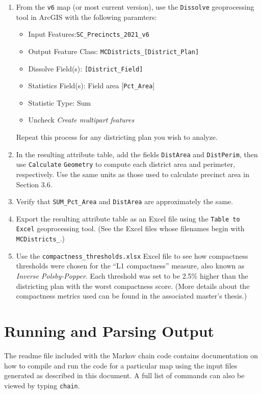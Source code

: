 \documentclass[11pt]{article}
\begin{document}
\begin{enumerate}
\item From the \verb|v6| map (or most current version), use the \verb|Dissolve| geoprocessing tool in ArcGIS with the following paramters:
\begin{itemize}
	\item Input Features:\verb|SC_Precincts_2021_v6|
	\item Output Feature Class: \verb|MCDistricts_[District_Plan]|
	\item Dissolve Field(s): \verb|[District_Field]|
	\item Statistics Field(s): Field area [\verb|Pct_Area|]
	\item Statistic Type: Sum
	\item Uncheck \textit{Create multipart features}
\end{itemize}

Repeat this process for any districting plan you wish to analyze.

\item In the resulting attribute table, add the fields \verb|DistArea| and \verb|DistPerim|, then use \verb|Calculate| \verb|Geometry| to compute each district area and perimeter, respectively. Use the same units as those used to calculate precinct area in Section 3.6.
\item Verify that \verb|SUM_Pct_Area| and \verb|DistArea| are approximately the same.
\item Export the resulting attribute table as an Excel file using the \verb|Table to Excel| geoprocessing tool. (See the Excel files whose filenames begin with \verb|MCDistricts_|.)
\item Use the \verb|compactness_thresholds.xlsx| Excel file to see how compactness thresholds were chosen for the ``L1 compactness'' measure, also known as \textit{Inverse Polsby-Popper}. Each threshold was set to be 2.5\% higher than the districting plan with the worst compactness score. (More details about the compactness metrics used can be found in the associated master's thesis.)
\end{enumerate}

\section{Running and Parsing Output}

The readme file included with the Markov chain code contains documentation on how to compile and run the code for a particular map using the input files generated as described in this document. A full list of commands can also be viewed by typing \verb|chain|.\\
\end{document}
